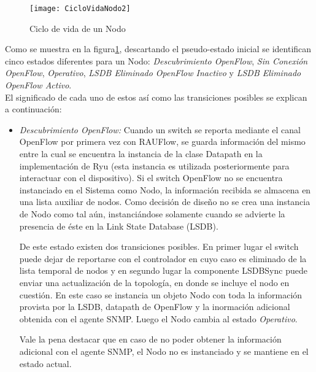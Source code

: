 \begin{figure}[ht!] 
\centering    
\texttt{[image: CicloVidaNodo2]}
\caption[Ciclo de vida de un Nodo]{Ciclo de vida de un Nodo}
\label{fig:CicloVidaNodo}
\end{figure}
  
Como se muestra en la figura\ref{fig:CicloVidaNodo}, descartando el pseudo-estado inicial se identifican cinco estados diferentes para un Nodo: \textit{Descubrimiento OpenFlow}, \textit{Sin Conexión OpenFlow}, \textit{Operativo}, \textit{LSDB Eliminado OpenFlow Inactivo} y \textit{LSDB Eliminado OpenFlow Activo}.\\

El significado de cada uno de estos as\'i como las transiciones posibles se explican a continuación:

\begin{itemize}
\item \textit{Descubrimiento OpenFlow:} Cuando un switch se reporta mediante el canal OpenFlow por primera vez con RAUFlow, se guarda informaci\'on del mismo entre la cual se encuentra la instancia de la clase Datapath en la implementaci\'on de Ryu (esta instancia es utilizada posteriormente para interactuar con el dispositivo). Si el switch OpenFlow no se encuentra instanciado en el Sistema como Nodo, la informaci\'on recibida se almacena en una lista auxiliar de nodos. Como decisión de diseño no se crea una instancia de Nodo como tal a\'un, instanci\'andose solamente cuando se advierte la presencia de \'este en la Link State Database (LSDB).


De este estado existen dos transiciones posibles. En primer lugar el switch puede dejar de reportarse con el controlador en cuyo caso es eliminado de la lista temporal de nodos y en segundo lugar la componente LSDBSync puede enviar una actualizaci\'on de la topolog\'ia, en donde se incluye el nodo en cuestión. En este caso se instancia un objeto Nodo con toda la informaci\'on provista por la LSDB, datapath de OpenFlow y la inormaci\'on adicional obtenida con el agente SNMP. Luego el Nodo cambia al estado \textit{Operativo}.

Vale la pena destacar que en caso de no poder obtener la informaci\'on adicional con el agente SNMP, el Nodo no es instanciado y se mantiene en el estado actual.


\end{itemize}

